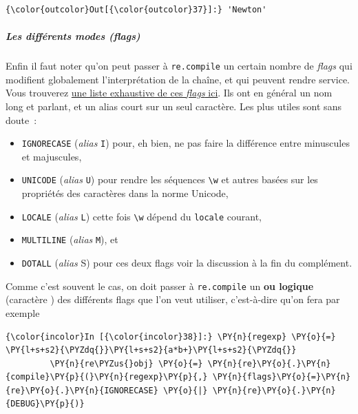 \begin{Verbatim}[commandchars=\\\{\}]
{\color{outcolor}Out[{\color{outcolor}37}]:} 'Newton'
\end{Verbatim}
            
    \hypertarget{les-diffuxe9rents-modes-flags}{%
\subparagraph{\texorpdfstring{Les différents modes
(\emph{flags})}{Les différents modes (flags)}}\label{les-diffuxe9rents-modes-flags}}

    Enfin il faut noter qu'on peut passer à \texttt{re.compile} un certain
nombre de \emph{flags} qui modifient globalement l'interprétation de la
chaîne, et qui peuvent rendre service.\\

    Vous trouverez
\href{https://docs.python.org/3/library/re.html\#module-contents}{une
liste exhaustive de ces \emph{flags} ici}. Ils ont en général un nom
long et parlant, et un alias court sur un seul caractère. Les plus
utiles sont sans doute~:

\begin{itemize}
	\item 
	\texttt{IGNORECASE} (\emph{alias} \texttt{I})
	pour, eh bien, ne pas faire la différence entre minuscules et
	majuscules,
	\item
	\texttt{UNICODE} (\emph{alias} \texttt{U}) pour rendre les
	séquences \texttt{\textbackslash{}w} et autres basées sur les propriétés
	des caractères dans la norme Unicode,
	\item
	\texttt{LOCALE} (\emph{alias}
	\texttt{L}) cette fois \texttt{\textbackslash{}w} dépend du
	\texttt{locale} courant,
	\item
	\texttt{MULTILINE} (\emph{alias} \texttt{M}), et
	\item
	\texttt{DOTALL} (\emph{alias} S) pour ces deux flags voir la
	discussion à la fin du complément.
\end{itemize}

    Comme c'est souvent le cas, on doit passer à \texttt{re.compile} un
\textbf{ou logique} (caractère \texttt{\textbar{}}) des différents flags
que l'on veut utiliser, c'est-à-dire qu'on fera par exemple

    \begin{Verbatim}[commandchars=\\\{\}]
{\color{incolor}In [{\color{incolor}38}]:} \PY{n}{regexp} \PY{o}{=} \PY{l+s+s2}{\PYZdq{}}\PY{l+s+s2}{a*b+}\PY{l+s+s2}{\PYZdq{}}
         \PY{n}{re\PYZus{}obj} \PY{o}{=} \PY{n}{re}\PY{o}{.}\PY{n}{compile}\PY{p}{(}\PY{n}{regexp}\PY{p}{,} \PY{n}{flags}\PY{o}{=}\PY{n}{re}\PY{o}{.}\PY{n}{IGNORECASE} \PY{o}{|} \PY{n}{re}\PY{o}{.}\PY{n}{DEBUG}\PY{p}{)}
\end{Verbatim}


